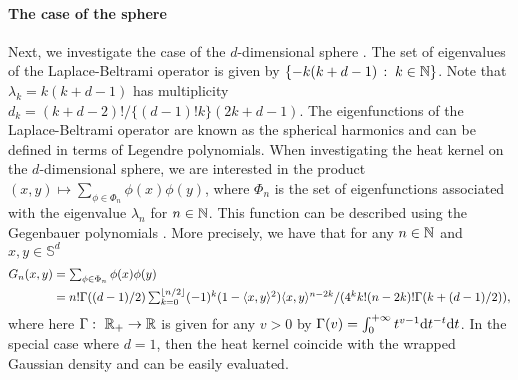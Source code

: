 \paragraph{The case of the sphere} Next, we investigate the case of the
$d$-dimensional sphere \citep[see][]{saloff1994precise}. The set of eigenvalues of
the Laplace-Beltrami operator is given by
$\{-k(k+d-1)\,:\; k \in \mathbb{N}\}$. Note that $\lambda_k = k(k+d-1)$ has
multiplicity $d_k = (k+d-2)!/\{(d-1)!k\}(2k+d-1)$. The eigenfunctions of the
Laplace-Beltrami operator are known as the spherical harmonics and can be
defined in terms of Legendre polynomials. When investigating the heat kernel on
the $d$-dimensional sphere, we are interested in the product
$(x,y) \mapsto \sum_{\phi \in \Phi_n} \phi(x)\phi(y)$, where $\Phi_n$ is the set
of eigenfunctions associated with the eigenvalue $\lambda_n$ for $n \in
\mathbb{N}$. This function can be described using the Gegenbauer polynomials
\cite[see][Theorem 2.9]{atkinson2012spherical}. More precisely, we have that for any
$n \in \mathbb{N}$ and $x,y \in \mathbb{S}^d$
\begin{align}
  G_n(x,y) &= \textstyle{ \sum_{\phi \in \Phi_n} \phi(x) \phi(y)} \\
  &= \textstyle{n! \Gamma((d-1)/2) \sum_{k=0}^{\left\lfloor n/2 \right\rfloor} (-1)^k (1- \langle x,y \rangle^2)\langle x,y \rangle^{n-2k} / (4^k k! (n -2k)! \Gamma(k + (d-1)/2) ) ,}
\end{align}
where here $\Gamma: \ \rset_+ \to \rset$ is given for any $v > 0$ by
$\Gamma(v) = \int_0^{+\infty} t^{v-1} \mathrm{d} t^{-t} \mathrm{d} t$.  In the special case
where $d=1$, then the heat kernel coincide with the wrapped Gaussian density and
can be easily evaluated.


